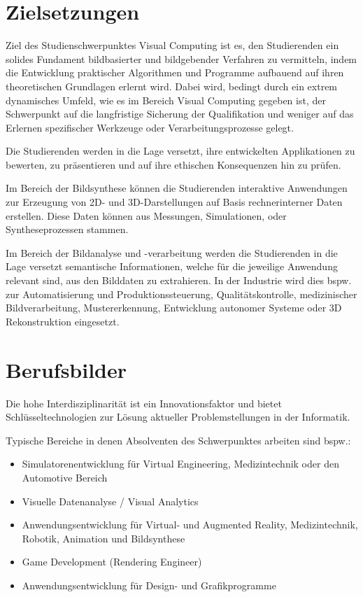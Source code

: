 \section*{Zielsetzungen\label{/mi-2017/modulbeschreibungen-master/schwerpunkt-visual-computing}}\label{zielsetzungenpathlabelmi-2017modulbeschreibungen-masterschwerpunkt-visual-computing}

Ziel des Studienschwerpunktes Visual Computing ist es, den Studierenden
ein solides Fundament bildbasierter und bildgebender Verfahren zu
vermitteln, indem die Entwicklung praktischer Algorithmen und Programme
aufbauend auf ihren theoretischen Grundlagen erlernt wird. Dabei wird,
bedingt durch ein extrem dynamisches Umfeld, wie es im Bereich Visual
Computing gegeben ist, der Schwerpunkt auf die langfristige Sicherung
der Qualifikation und weniger auf das Erlernen spezifischer Werkzeuge
oder Verarbeitungsprozesse gelegt.

Die Studierenden werden in die Lage versetzt, ihre entwickelten
Applikationen zu bewerten, zu präsentieren und auf ihre ethischen
Konsequenzen hin zu prüfen.

Im Bereich der Bildsynthese können die Studierenden interaktive
Anwendungen zur Erzeugung von 2D- und 3D-Darstellungen auf Basis
rechnerinterner Daten erstellen. Diese Daten können aus Messungen,
Simulationen, oder Syntheseprozessen stammen.

Im Bereich der Bildanalyse und -verarbeitung werden die Studierenden in
die Lage versetzt semantische Informationen, welche für die jeweilige
Anwendung relevant sind, aus den Bilddaten zu extrahieren. In der
Industrie wird dies bspw. zur Automatisierung und Produktionssteuerung,
Qualitätskontrolle, medizinischer Bildverarbeitung, Mustererkennung,
Entwicklung autonomer Systeme oder 3D Rekonstruktion eingesetzt.

\section*{Berufsbilder\label{/mi-2017/modulbeschreibungen-master/schwerpunkt-visual-computing}}\label{berufsbilderpathlabelmi-2017modulbeschreibungen-masterschwerpunkt-visual-computing}

Die hohe Interdisziplinarität ist ein Innovationsfaktor und bietet
Schlüsseltechnologien zur Lösung aktueller Problemstellungen in der
Informatik.

Typische Bereiche in denen Absolventen des Schwerpunktes arbeiten sind
bspw.:

\begin{itemize}
\tightlist
\item
  Simulatorenentwicklung für Virtual Engineering, Medizintechnik oder
  den Automotive Bereich
\item
  Visuelle Datenanalyse / Visual Analytics
\item
  Anwendungsentwicklung für Virtual- und Augmented Reality,
  Medizintechnik, Robotik, Animation und Bildsynthese
\item
  Game Development (Rendering Engineer)
\item
  Anwendungsentwicklung für Design- und Grafikprogramme
\end{itemize}

